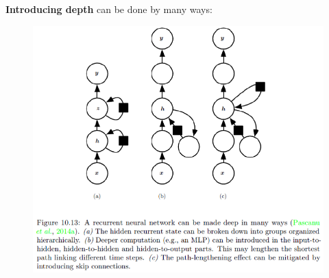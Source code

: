 \begin{multicols}{2}
	\textbf{Introducing depth} can be done by many ways:
	\begin{figure}[H]
		\centering
		\includegraphics[width=0.9\linewidth]{images/rnn.png}
	\end{figure}
	

\end{multicols}
